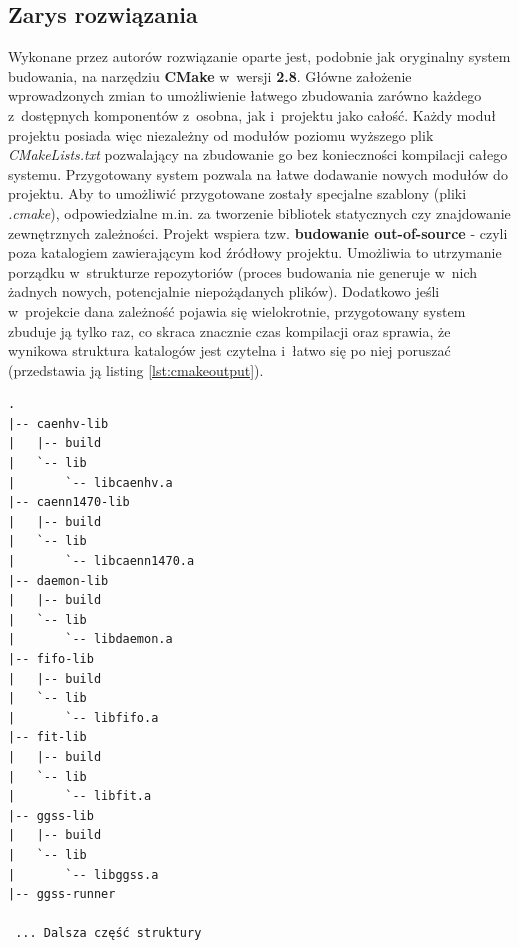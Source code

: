 \subsection{Zarys rozwiązania} 
Wykonane przez autorów rozwiązanie oparte jest, podobnie jak oryginalny system budowania, na narzędziu \textbf{CMake} w~wersji \textbf{2.8}. Główne założenie wprowadzonych zmian to umożliwienie łatwego zbudowania zarówno każdego z~dostępnych komponentów z~osobna, jak i~projektu jako całość. Każdy moduł projektu posiada więc niezależny od modułów poziomu wyższego plik \textit{CMakeLists.txt} pozwalający na zbudowanie go bez konieczności kompilacji całego systemu. Przygotowany system pozwala na łatwe dodawanie nowych modułów do projektu. Aby to umożliwić przygotowane zostały specjalne szablony (pliki \textit{.cmake}), odpowiedzialne m.in. za tworzenie bibliotek statycznych czy znajdowanie zewnętrznych zależności. Projekt wspiera tzw. \textbf{budowanie out-of-source} - czyli poza katalogiem zawierającym kod źródłowy projektu. Umożliwia to utrzymanie porządku w~strukturze repozytoriów (proces budowania nie generuje w~nich żadnych nowych, potencjalnie niepożądanych plików). Dodatkowo jeśli w~projekcie dana zależność pojawia się wielokrotnie, przygotowany system zbuduje ją tylko raz, co skraca znacznie czas kompilacji oraz sprawia, że wynikowa struktura katalogów jest czytelna i~łatwo się po niej poruszać (przedstawia ją listing \ref{lst:cmakeoutput}). 

\begin{lstlisting}[language=Cmd, caption={Fragment struktury katalogów wygenerowanej przez nowy system budujący projekt (użycie dla repozytorium \textit{ggss-runner}). Dla uproszczenia pominięta została zawartość katalogów \textit{build}. Przykład ilustruje płaską strukturę wynikową ułatwiającą szybkie znalezienie odpowiedniej biblioteki lub pliku wykonywalnego (tutaj \textit{ggss-runner})}, label={lst:cmakeoutput}]
.
|-- caenhv-lib
|   |-- build
|   `-- lib
|       `-- libcaenhv.a
|-- caenn1470-lib
|   |-- build
|   `-- lib
|       `-- libcaenn1470.a
|-- daemon-lib
|   |-- build
|   `-- lib
|       `-- libdaemon.a
|-- fifo-lib
|   |-- build
|   `-- lib
|       `-- libfifo.a
|-- fit-lib
|   |-- build
|   `-- lib
|       `-- libfit.a
|-- ggss-lib
|   |-- build
|   `-- lib
|       `-- libggss.a
|-- ggss-runner
 
 ... Dalsza część struktury
\end{lstlisting}


